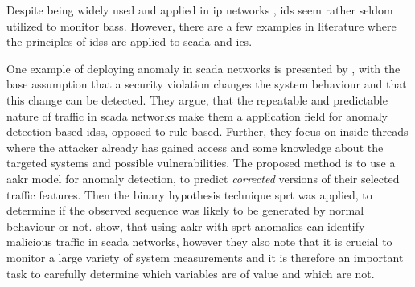 Despite being widely used and applied in \gls{ip} networks \parencite[cf.][pp.~201~ff.]{Northcutt2005}, \gls{ids} seem rather seldom utilized to monitor \glspl{bas}.
However, there are a few examples in literature where the principles of \glspl{ids} are applied to \gls{scada} and \gls{ics}.

One example of deploying anomaly in \gls{scada} networks is presented by \textcite{Yang2006}, with the base assumption that a security violation changes the system behaviour and that this change can be detected. They argue, that the repeatable and predictable nature of traffic in \gls{scada} networks make them a application field for anomaly detection based \glspl{ids}, opposed to rule based.
Further, they focus on inside threads where the attacker already has gained access and some knowledge about the targeted systems and possible vulnerabilities.
The proposed method is to use a \gls{aakr} model for anomaly detection, to predict \emph{corrected} versions of their selected traffic features. Then the binary hypothesis technique \gls{sprt} was applied, to determine if the observed sequence was likely to be generated by normal behaviour or not.
\textcite{Yang2006} show, that using \gls{aakr} with \gls{sprt} anomalies can identify malicious traffic in \gls{scada} networks, however they also note that it is crucial to monitor a large variety of system measurements and it is therefore an important task to carefully determine which variables are of value and which are not.

